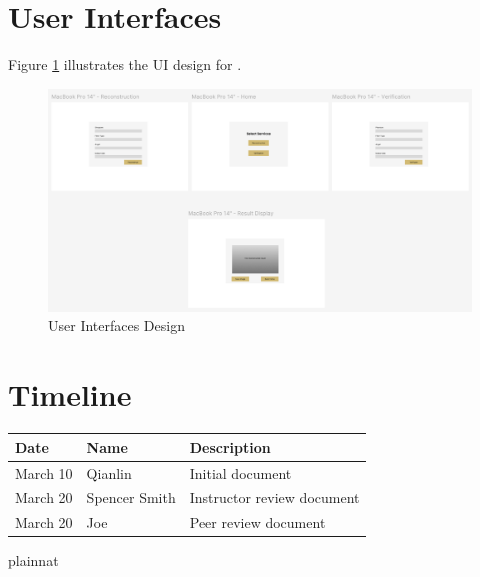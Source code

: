 \documentclass[12pt, titlepage]{article}
\begin{document}

\section{User Interfaces}
Figure \ref{FigUI} illustrates the UI design for \progname.
\begin{figure}[H]
\centering
\includegraphics[width=0.8\paperwidth]{UI.png}
\caption{User Interfaces Design}
\label{FigUI}
\end{figure}

\section{Timeline}
\begin{tabularx}{\textwidth}{p{3cm}p{2cm}X}
\toprule {\bf Date} & {\bf Name} & {\bf Description}\\
\midrule
March 10 & Qianlin & Initial document\\
March 20 & Spencer Smith & Instructor review document\\
March 20 & Joe & Peer review document\\
\bottomrule
\end{tabularx}

 {plainnat}


\newpage{}
\end{document}
